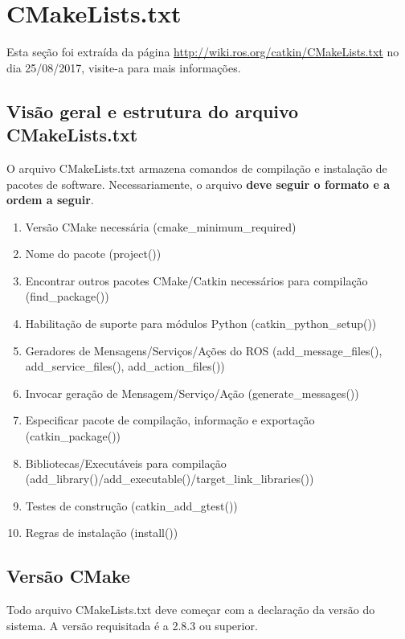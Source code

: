 \chapter{CMakeLists.txt}
\label{cmake}

Esta seção foi extraída da página \url{http://wiki.ros.org/catkin/CMakeLists.txt} no dia 25/08/2017, visite-a para mais informações.

\section{Visão geral e estrutura do arquivo CMakeLists.txt}

O arquivo CMakeLists.txt armazena comandos de compilação e instalação de pacotes de software. Necessariamente, o arquivo \textbf{deve seguir o formato e a ordem a seguir}. 

\begin{enumerate}
	\setlength{\itemsep}{1pt}
	\setlength{\parskip}{0pt}
	\setlength{\parsep}{0pt}
	\item Versão CMake necessária (cmake\_minimum\_required)
	\item Nome do pacote (project())
	\item Encontrar outros pacotes CMake/Catkin necessários para compilação (find\_package())
	\item Habilitação de suporte para módulos Python (catkin\_python\_setup())
	\item Geradores de Mensagens/Serviços/Ações do ROS (add\_message\_files(), add\_service\_files(), add\_action\_files())
	\item Invocar geração de Mensagem/Serviço/Ação (generate\_messages())
	\item Especificar pacote  de compilação, informação e exportação (catkin\_package())
	\item Bibliotecas/Executáveis para compilação (add\_library()/add\_executable()/target\_link\_libraries())
	\item Testes de construção (catkin\_add\_gtest())
	\item Regras de instalação (install())	
\end{enumerate}

\section{Versão CMake}

Todo arquivo CMakeLists.txt deve começar com a declaração da versão do sistema. A versão requisitada é a 2.8.3 ou superior.

